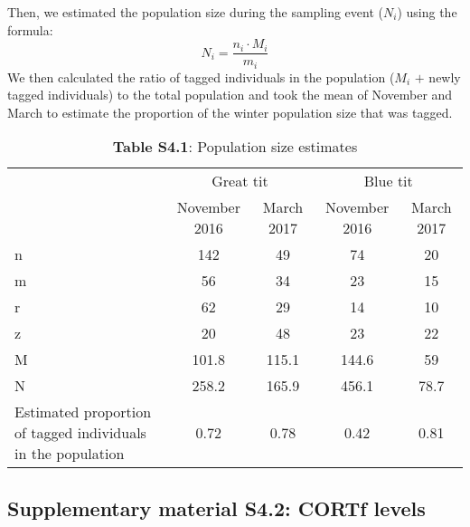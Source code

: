 \documentclass[10pt, twoside]{book} %
\begin{document}
Then, we estimated the population size during the sampling event ($N_i$) using the formula:
\begin{equation*}
	N_i = \frac{n_i \cdot M_i}{m_i}
\end{equation*}
We then calculated the ratio of tagged individuals in the population ($M_i$ $+$ newly tagged individuals) to the total population and took the mean of November and March to estimate the proportion of the winter population size that was tagged.

\begin{table}[h!]
	\begin{center}
		\begin{footnotesize}
			\caption*{\textbf{Table S4.1}: Population size estimates} 
			
			\begingroup
			\setlength{\tabcolsep}{8pt} %
			\renewcommand{\arraystretch}{1.5} %
			\begin{tabular}{p{3cm} c c c c}
			\toprule
			& \multicolumn{2}{c}{Great tit} & \multicolumn{2}{c}{Blue tit}\\
			\cmidrule(r){2-3} \cmidrule(r){4-5}
			& November 2016 & March 2017 & November 2016 & March 2017\\
			\cmidrule{1-5}
			n & 142 & 49 & 74 & 20\\
			m & 56 & 34 & 23 & 15\\
			r & 62 & 29 & 14 & 10\\
			z & 20 & 48 & 23 & 22\\
			M & 101.8 & 115.1 & 144.6 & 59\\
			N & 258.2 & 165.9 & 456.1 & 78.7\\
			Estimated proportion of tagged individuals in the population & 0.72 & 0.78 & 0.42 & 0.81\\
			\bottomrule
			\end{tabular}
		\end{footnotesize}\endgroup
	\end{center}
\end{table}
\clearpage

	\subsection*{Supplementary material S4.2: CORTf levels}
	
\end{document}
